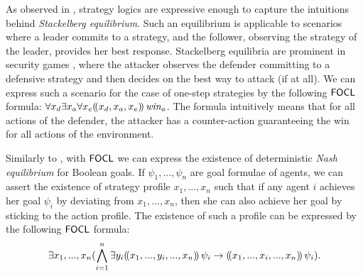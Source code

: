 \documentclass[sigconf,anonymous]{aamas}
\begin{document}
   
   

\begin{example}
As observed in \cite{belardinelli19}, strategy logics are expressive enough to capture the intuitions behind \textit{Stackelberg equilibrium}. Such an equilibrium is applicable to scenarios where a leader commits to a strategy, and the follower, observing the strategy of the leader, provides her best response. Stackelberg equilibria are prominent in security games \cite{sinha18}, where the attacker observes the defender committing to a defensive strategy and then decides on the best way to attack (if at all). We can express such a scenario for the case of one-step strategies by the following $\mathsf{FOCL}$ formula: $\forall x_d \exists x_a \forall x_e (\!( x_d, x_a, x_e )\!)\, \mathit{win_a}$. The formula intuitively means that for all actions of the defender, the attacker has a counter-action guaranteeing the win for all actions of the environment.    

Similarly to \cite{mogavero10}, with $\mathsf{FOCL}$ we can express the existence of deterministic \textit{Nash equilibrium} for Boolean goals. If $\psi_1, ..., \psi_n$ are goal formulae of agents, we can assert the existence of strategy profile $x_1,...,x_n$ such that if any agent $i$ achieves her goal $\psi_i$ by deviating from $x_1,...,x_n$, then she can also achieve her goal by sticking to the action profile. The existence of such a profile can be expressed by the following $\mathsf{FOCL}$ formula:
$$\exists x_1, ..., x_n (\bigwedge_{i=1}^n \exists y_i (\!( x_1,..., y_i, ..., x_n )\!)\,\psi_i \to (\!( x_1,..., x_i, ..., x_n )\!)\, \psi_i).$$
\end{example}
\end{document}
